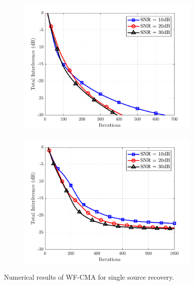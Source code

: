 \begin{figure}
\begin{subfigure}[t]{0.32\textwidth}
\label{wfcma:fig:wf_ssr_success_M16L9}
\end{subfigure}\hfill
\begin{subfigure}[t]{0.32\textwidth}
\includegraphics[width=\linewidth]{./figs/wfcma_figs/BF_WF_TI_4QAM_L=9_M=16_K=1000_2.pdf}
\label{wfcma:fig:wf_ssr_4qam_M16L9}
\end{subfigure}\hfill
\begin{subfigure}[t]{0.32\textwidth}
\includegraphics[width=\linewidth]{./figs/wfcma_figs/BF_WF_TI_16QAM_L=9_M=16_K=1000_2.pdf}	
\label{wfcma:fig:wf_ssr_16qam_M16L9}
\end{subfigure}
\caption{Numerical results of WF-CMA for single source recovery.}
\label{wfcma:fig:CMA_WF_ssr}
\end{figure}

